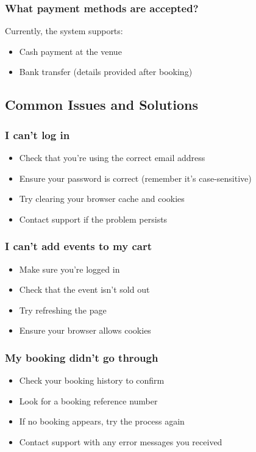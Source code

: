 \documentclass[12pt,a4paper]{article}
\begin{document}
\subsubsection{What payment methods are accepted?}
Currently, the system supports:
\begin{itemize}
    \item Cash payment at the venue
    \item Bank transfer (details provided after booking)
\end{itemize}

\subsection{Common Issues and Solutions}

\subsubsection{I can't log in}
\begin{itemize}
    \item Check that you're using the correct email address
    \item Ensure your password is correct (remember it's case-sensitive)
    \item Try clearing your browser cache and cookies
    \item Contact support if the problem persists
\end{itemize}

\subsubsection{I can't add events to my cart}
\begin{itemize}
    \item Make sure you're logged in
    \item Check that the event isn't sold out
    \item Try refreshing the page
    \item Ensure your browser allows cookies
\end{itemize}

\subsubsection{My booking didn't go through}
\begin{itemize}
    \item Check your booking history to confirm
    \item Look for a booking reference number
    \item If no booking appears, try the process again
    \item Contact support with any error messages you received
\end{itemize}
\end{document}

